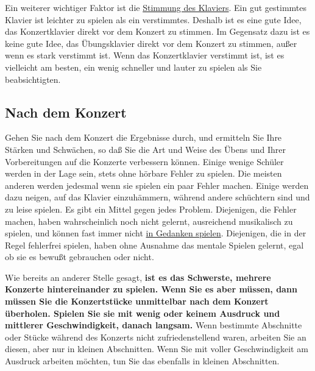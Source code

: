 \hypertarget{c1iii14Stimmung}{}

Ein weiterer wichtiger Faktor ist die \hyperlink{c2_1}{Stimmung des Klaviers}.
Ein gut gestimmtes Klavier ist leichter zu spielen als ein verstimmtes.
Deshalb ist es eine gute Idee, das Konzertklavier direkt vor dem Konzert zu stimmen.
Im Gegensatz dazu ist es keine gute Idee, das Übungsklavier direkt vor dem Konzert zu stimmen, außer wenn es stark verstimmt ist.
Wenn das Konzertklavier verstimmt ist, ist es vielleicht am besten, ein wenig schneller und lauter zu spielen als Sie beabsichtigten.


\subsection{Nach dem Konzert}\hypertarget{c1iii14i}{}

Gehen Sie nach dem Konzert die Ergebnisse durch, und ermitteln Sie Ihre Stärken und Schwächen, so daß Sie die Art und Weise des Übens und Ihrer Vorbereitungen auf die Konzerte verbessern können.
Einige wenige Schüler werden in der Lage sein, stets ohne hörbare Fehler zu spielen.
Die meisten anderen werden jedesmal wenn sie spielen ein paar Fehler machen.
Einige werden dazu neigen, auf das Klavier einzuhämmern, während andere schüchtern sind und zu leise spielen.
Es gibt ein Mittel gegen jedes Problem.
Diejenigen, die Fehler machen, haben wahrscheinlich noch nicht gelernt, ausreichend musikalisch zu spielen, und können fast immer nicht \hyperlink{c1ii12mental}{in Gedanken spielen}.
Diejenigen, die in der Regel fehlerfrei spielen, haben ohne Ausnahme das mentale Spielen gelernt, egal ob sie es bewußt gebrauchen oder nicht.

Wie bereits an anderer Stelle gesagt, \textbf{ist es das Schwerste, mehrere Konzerte hintereinander zu spielen.
Wenn Sie es aber müssen, dann müssen Sie die Konzertstücke unmittelbar nach dem Konzert überholen.
Spielen Sie sie mit wenig oder keinem Ausdruck und mittlerer Geschwindigkeit, danach langsam.}
Wenn bestimmte Abschnitte oder Stücke während des Konzerts nicht zufriedenstellend waren, arbeiten Sie an diesen, aber nur in kleinen Abschnitten.
Wenn Sie mit voller Geschwindigkeit am Ausdruck arbeiten möchten, tun Sie das ebenfalls in kleinen Abschnitten.



